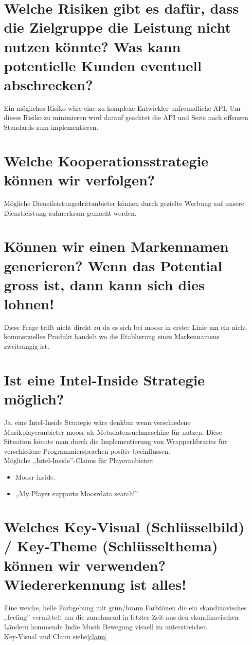 \section{Welche Risiken gibt es dafür, dass die Zielgruppe die Leistung nicht nutzen könnte? Was kann potentielle Kunden eventuell abschrecken?}
Ein mögliches Risiko wäre eine zu komplexe Entwickler unfreundliche API. Um
dieses Risiko zu minimieren wird darauf geachtet die API und Seite nach offenzen
Standards zum implementieren.

\section{Welche Kooperationsstrategie können wir verfolgen?}
Mögliche Dienstleistungsdrittanbieter können durch gezielte Werbung auf unsere 
Dienstleistung aufmerksam gemacht werden.

\label{Markenname}
\section{Können wir einen Markennamen generieren? Wenn das Potential gross ist, dann kann sich dies lohnen!}
Diese Frage trifft nicht direkt zu da es sich bei moosr in erster Linie um ein
nicht kommerzielles Produkt handelt wo die Etablierung eines Markennamens
zweitrangig ist. 

\section{Ist eine Intel-Inside Strategie möglich?}
Ja, eine Intel-Inside Strategie wäre denkbar wenn verschiedene Musikplayeranbieter
moosr als Metadatensuchmaschine für nutzen. Diese Situation könnte man durch die
Implementierung von Wrapperlibraries für verschiedene Programmiersprachen
positiv beeinflussen.
\\
Mögliche ,,Intel-Inside''-Claims für Playeranbieter:
\begin{itemize}
    \item Moosr inside.
    \item ,,My Player supports Moosrdata search!''
\end{itemize}

\section{Welches Key-Visual (Schlüsselbild) / Key-Theme (Schlüsselthema) können wir verwenden? Wiedererkennung ist alles!}
Eine weiche, helle Farbgebung mit grün/braun Farbtönen die ein skandinavisches
,,feeling'' vermittelt um die zunehmend in letzter Zeit aus den skandinavischen
Ländern kommende Indie Musik Bewegung visuell zu  unterstreichen.
\\
Key-Visual und Claim siehe\ref{claim}

